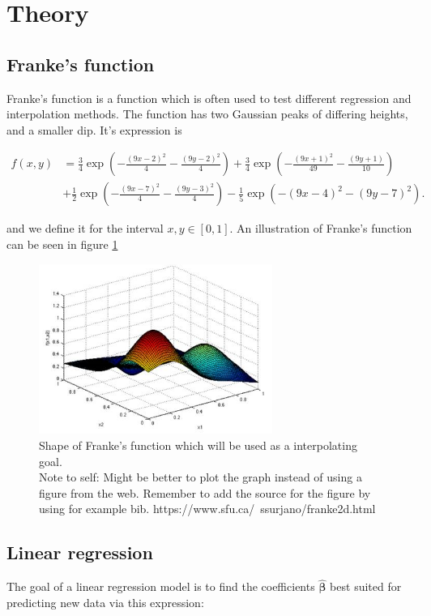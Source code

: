 \documentclass[../main.tex]{subfiles}
\begin{document}
\section{Theory}\label{sec:theory}

\subsection{Franke's function}
Franke's function is a function which is often used to test different regression and interpolation methods. The function has two Gaussian peaks of differing heights, and a smaller dip. It's expression is

\begin{align*}
  f(x,y) &= \frac{3}{4}\exp{\left(-\frac{(9x-2)^2}{4} - \frac{(9y-2)^2}{4}\right)}+\frac{3}{4}\exp{\left(-\frac{(9x+1)^2}{49}- \frac{(9y+1)}{10}\right)} \\
  &+\frac{1}{2}\exp{\left(-\frac{(9x-7)^2}{4} - \frac{(9y-3)^2}{4}\right)} -\frac{1}{5}\exp{\left(-(9x-4)^2 - (9y-7)^2\right) }.
\end{align*}

and we define it for the interval $x,y\in[0,1]$. An illustration of Franke's function can be seen in figure \ref{fig:frankesplot}

\begin{figure}
  \centering
  \includegraphics[width = 3in]{frankesfunction_plot.png}
  \caption{Shape of Franke's function which will be used as a interpolating goal.
  \\Note to self: Might be better to plot the graph instead of using a figure from the web. Remember to add the source for the figure by using for example bib. https://www.sfu.ca/~ssurjano/franke2d.html}
  \label{fig:frankesplot}
\end{figure}


\subsection{Linear regression}
The goal of a linear regression model is to find the coefficients $\hat{\mathbf \beta}$ best suited for predicting new data via this expression:
\end{document}
